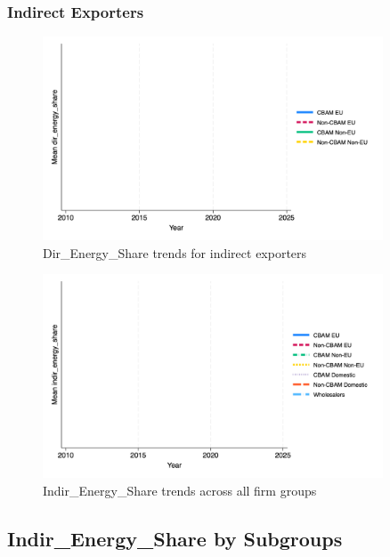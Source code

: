 \documentclass{article}
\begin{document}
\subsubsection{Indirect Exporters}
\begin{figure}[h!]
\centering
\includegraphics[width=0.9\textwidth]{dir_energy_share_indir.png}
\caption{Dir_Energy_Share trends for indirect exporters}
\label{fig:dir_energy_share_indir}
\end{figure}

\begin{figure}[h!]
\centering
\includegraphics[width=0.9\textwidth]{indir_energy_share_main_groups.png}
\caption{Indir_Energy_Share trends across all firm groups}
\label{fig:indir_energy_share_main}
\end{figure}

\subsection{Indir_Energy_Share by Subgroups}
\end{document}
